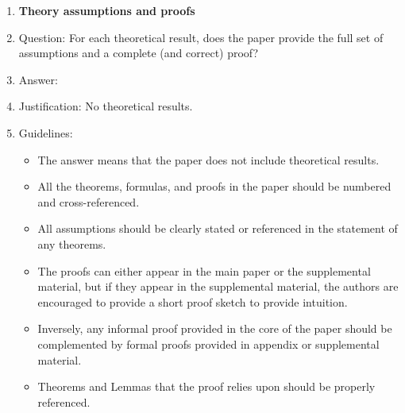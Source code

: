 \documentclass{article}
\theoremstyle{plain}
\theoremstyle{definition}
\theoremstyle{remark}
\begin{document}
\begin{enumerate}
\item {\bf Theory assumptions and proofs}
    \item[] Question: For each theoretical result, does the paper provide the full set of assumptions and a complete (and correct) proof?
    \item[] Answer: \answerNA{} %
    \item[] Justification: No theoretical results.
    \item[] Guidelines:
    \begin{itemize}
        \item The answer \answerNA{} means that the paper does not include theoretical results. 
        \item All the theorems, formulas, and proofs in the paper should be numbered and cross-referenced.
        \item All assumptions should be clearly stated or referenced in the statement of any theorems.
        \item The proofs can either appear in the main paper or the supplemental material, but if they appear in the supplemental material, the authors are encouraged to provide a short proof sketch to provide intuition. 
        \item Inversely, any informal proof provided in the core of the paper should be complemented by formal proofs provided in appendix or supplemental material.
        \item Theorems and Lemmas that the proof relies upon should be properly referenced. 
    \end{itemize}


\end{enumerate}
\end{document}
